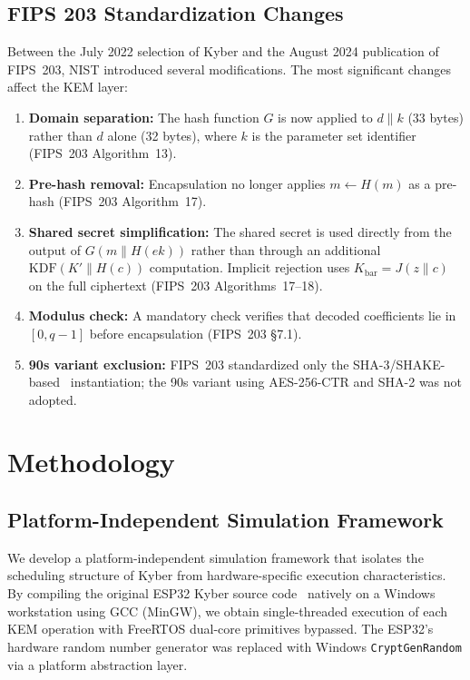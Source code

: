 \documentclass[journal]{IEEEtran}
\begin{document}
\subsection{FIPS 203 Standardization Changes}

Between the July 2022 selection of Kyber and the August 2024 publication of FIPS~203, NIST introduced several modifications. The most significant changes affect the KEM layer:

\begin{enumerate}
\item \textbf{Domain separation:} The hash function $G$ is now applied to $d \| k$ (33 bytes) rather than $d$ alone (32 bytes), where $k$ is the parameter set identifier (FIPS~203 Algorithm~13).
\item \textbf{Pre-hash removal:} Encapsulation no longer applies $m \leftarrow H(m)$ as a pre-hash (FIPS~203 Algorithm~17).
\item \textbf{Shared secret simplification:} The shared secret is used directly from the output of $G(m \| H(ek))$ rather than through an additional $\mathrm{KDF}(K' \| H(c))$ computation. Implicit rejection uses $K_{\mathrm{bar}} = J(z \| c)$ on the full ciphertext (FIPS~203 Algorithms~17--18).
\item \textbf{Modulus check:} A mandatory check verifies that decoded coefficients lie in $[0, q-1]$ before encapsulation (FIPS~203 \S7.1).
\item \textbf{90s variant exclusion:} FIPS~203 standardized only the SHA-3/SHAKE-based~\cite{keccak2011} instantiation; the 90s variant using AES-256-CTR and SHA-2 was not adopted.
\end{enumerate}


\section{Methodology}

\subsection{Platform-Independent Simulation Framework}

We develop a platform-independent simulation framework that isolates the scheduling structure of Kyber from hardware-specific execution characteristics. By compiling the original ESP32 Kyber source code~\cite{pqcrystals, segatz2022repo} natively on a Windows workstation using GCC (MinGW), we obtain single-threaded execution of each KEM operation with FreeRTOS dual-core primitives bypassed. The ESP32's hardware random number generator was replaced with Windows \texttt{CryptGenRandom} via a platform abstraction layer.
\end{document}

